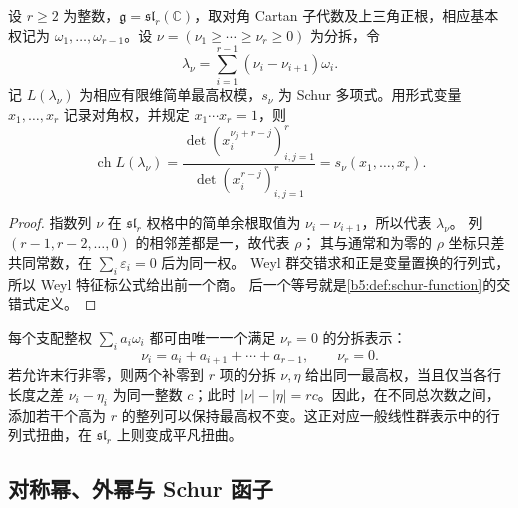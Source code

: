 \begin{proposition}\label{b5:prop:type-a-schur-character}
	设 \(r\ge2\) 为整数，\(\mathfrak g=\mathfrak{sl}_r(\mathbb C)\)，取对角 Cartan 子代数及上三角正根，相应基本权记为 \(\omega_1,\ldots,\omega_{r-1}\)。设 \(\nu=(\nu_1\ge\cdots\ge\nu_r\ge0)\) 为分拆，令
	\[
		\lambda_\nu=\sum_{i=1}^{r-1}(\nu_i-\nu_{i+1})\omega_i.
	\]
	记 \(L(\lambda_\nu)\) 为相应有限维简单最高权模，\(s_\nu\) 为 Schur 多项式。用形式变量 \(x_1,\ldots,x_r\) 记录对角权，并规定 \(x_1\cdots x_r=1\)，则
	\[
		\operatorname{ch}L(\lambda_\nu) =\frac{\det(x_i^{\nu_j+r-j})_{i,j=1}^r} {\det(x_i^{r-j})_{i,j=1}^r} =s_\nu(x_1,\ldots,x_r).
	\]
\end{proposition}
\begin{proof}
	指数列 \(\nu\) 在 \(\mathfrak{sl}_r\) 权格中的简单余根取值为 \(\nu_i-\nu_{i+1}\)，所以代表 \(\lambda_\nu\)。 列 \((r-1,r-2,\ldots,0)\) 的相邻差都是一，故代表 \(\rho\)； 其与通常和为零的 \(\rho\) 坐标只差共同常数，在 \(\sum_i\varepsilon_i=0\) 后为同一权。 Weyl 群交错求和正是变量置换的行列式，所以 Weyl 特征标公式给出前一个商。 后一个等号就是\cref{b5:def:schur-function}的交错式定义。
\end{proof}

每个支配整权 \(\sum_i a_i\omega_i\) 都可由唯一一个满足 \(\nu_r=0\) 的分拆表示：
\[
	\nu_i=a_i+a_{i+1}+\cdots+a_{r-1},\qquad \nu_r=0.
\]
若允许末行非零，则两个补零到 \(r\) 项的分拆 \(\nu,\eta\) 给出同一最高权，当且仅当各行长度之差 \(\nu_i-\eta_i\) 为同一整数 \(c\)；此时 \(|\nu|-|\eta|=rc\)。因此，在不同总次数之间，添加若干个高为 \(r\) 的整列可以保持最高权不变。这正对应一般线性群表示中的行列式扭曲，在 \(\mathfrak{sl}_r\) 上则变成平凡扭曲。

\subsection{对称幂、外幂与 Schur 函子}
\label{b5:subsec:1906:02}

